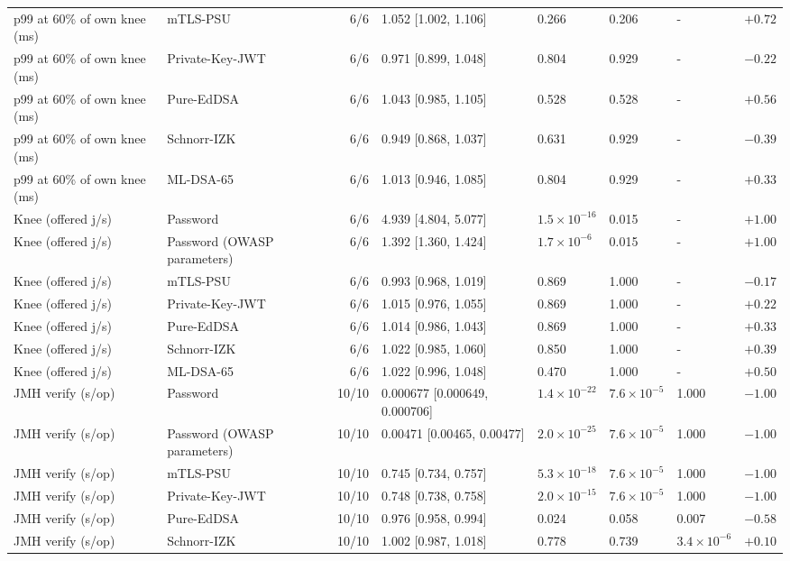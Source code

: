 \begin{tabular}{@{}llrlllll@{}}
p99 at 60\% of own knee (ms) & mTLS-PSU & 6/6 & 1.052 [1.002, 1.106] & 0.266 & 0.206 & - & $+0.72$ \\
p99 at 60\% of own knee (ms) & Private-Key-JWT & 6/6 & 0.971 [0.899, 1.048] & 0.804 & 0.929 & - & $-0.22$ \\
p99 at 60\% of own knee (ms) & Pure-EdDSA & 6/6 & 1.043 [0.985, 1.105] & 0.528 & 0.528 & - & $+0.56$ \\
p99 at 60\% of own knee (ms) & Schnorr-IZK & 6/6 & 0.949 [0.868, 1.037] & 0.631 & 0.929 & - & $-0.39$ \\
p99 at 60\% of own knee (ms) & ML-DSA-65 & 6/6 & 1.013 [0.946, 1.085] & 0.804 & 0.929 & - & $+0.33$ \\
Knee (offered j/s) & Password & 6/6 & 4.939 [4.804, 5.077] & $1.5\times10^{-16}$ & 0.015 & - & $+1.00$ \\
Knee (offered j/s) & Password (OWASP parameters) & 6/6 & 1.392 [1.360, 1.424] & $1.7\times10^{-6}$ & 0.015 & - & $+1.00$ \\
Knee (offered j/s) & mTLS-PSU & 6/6 & 0.993 [0.968, 1.019] & 0.869 & 1.000 & - & $-0.17$ \\
Knee (offered j/s) & Private-Key-JWT & 6/6 & 1.015 [0.976, 1.055] & 0.869 & 1.000 & - & $+0.22$ \\
Knee (offered j/s) & Pure-EdDSA & 6/6 & 1.014 [0.986, 1.043] & 0.869 & 1.000 & - & $+0.33$ \\
Knee (offered j/s) & Schnorr-IZK & 6/6 & 1.022 [0.985, 1.060] & 0.850 & 1.000 & - & $+0.39$ \\
Knee (offered j/s) & ML-DSA-65 & 6/6 & 1.022 [0.996, 1.048] & 0.470 & 1.000 & - & $+0.50$ \\
JMH verify (\textmu{}s/op) & Password & 10/10 & 0.000677 [0.000649, 0.000706] & $1.4\times10^{-22}$ & $7.6\times10^{-5}$ & 1.000 & $-1.00$ \\
JMH verify (\textmu{}s/op) & Password (OWASP parameters) & 10/10 & 0.00471 [0.00465, 0.00477] & $2.0\times10^{-25}$ & $7.6\times10^{-5}$ & 1.000 & $-1.00$ \\
JMH verify (\textmu{}s/op) & mTLS-PSU & 10/10 & 0.745 [0.734, 0.757] & $5.3\times10^{-18}$ & $7.6\times10^{-5}$ & 1.000 & $-1.00$ \\
JMH verify (\textmu{}s/op) & Private-Key-JWT & 10/10 & 0.748 [0.738, 0.758] & $2.0\times10^{-15}$ & $7.6\times10^{-5}$ & 1.000 & $-1.00$ \\
JMH verify (\textmu{}s/op) & Pure-EdDSA & 10/10 & 0.976 [0.958, 0.994] & 0.024 & 0.058 & 0.007 & $-0.58$ \\
JMH verify (\textmu{}s/op) & Schnorr-IZK & 10/10 & 1.002 [0.987, 1.018] & 0.778 & 0.739 & $3.4\times10^{-6}$ & $+0.10$ \\

\end{tabular}
